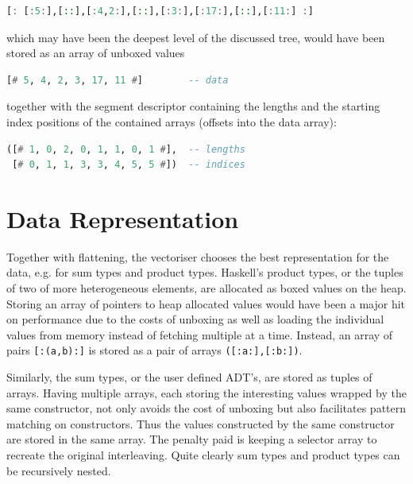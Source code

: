 \documentclass[preamble.tex]{subfiles}
\begin{document}
\begin{lstlisting}[basicstyle={\ttfamily},language=Haskell]
[: [:5:],[::],[:4,2:],[::],[:3:],[:17:],[::],[:11:] :]
\end{lstlisting}


which may have been the deepest level of the discussed tree, would have been stored as an array of unboxed values

\begin{lstlisting}[basicstyle={\ttfamily},language=Haskell]
[# 5, 4, 2, 3, 17, 11 #]        -- data
\end{lstlisting}


together with the segment descriptor containing the lengths and the starting index positions of the contained arrays (offsets into the data array):

\begin{lstlisting}[basicstyle={\ttfamily},language=Haskell]
([# 1, 0, 2, 0, 1, 1, 0, 1 #],  -- lengths
 [# 0, 1, 1, 3, 3, 4, 5, 5 #])  -- indices
\end{lstlisting}



\section{\label{sub:DPH-Data-Repr}Data Representation}

Together with flattening, the vectoriser chooses the best representation for the data, e.g. for sum types and product types. Haskell's product types, or the tuples of two of more heterogeneous elements, are allocated as boxed values on the heap. Storing an array of pointers to heap allocated values would have been a major hit on performance due to the costs of unboxing as well as loading the individual values from memory instead of fetching multiple at a time. Instead, an array of pairs \texttt{{[}:(a,b):{]}} is stored as a pair of arrays \texttt{({[}:a:{]},{[}:b:{]})}.

Similarly, the sum types, or the user defined ADT's, are stored as tuples of arrays. Having multiple arrays, each storing the interesting values wrapped by the same constructor, not only avoids the cost of unboxing but also facilitates pattern matching on constructors. Thus the values constructed by the same constructor are stored in the same array. The penalty paid is keeping a selector array to recreate the original interleaving. Quite clearly sum types and product types can be recursively nested.%

\end{document}

